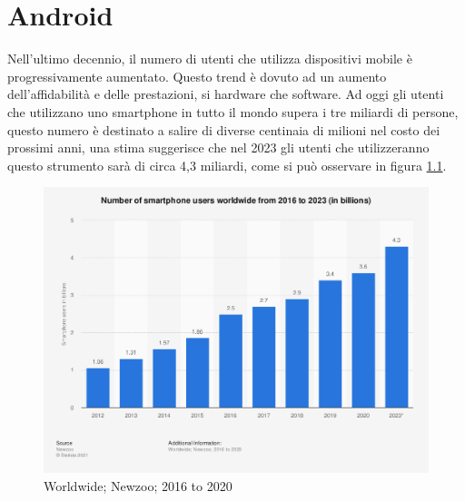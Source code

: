 
\chapter{Android}
\label{chap:cap2}

Nell'ultimo decennio, il numero di utenti che utilizza dispositivi mobile è progressivamente aumentato. Questo trend è dovuto ad un aumento dell'affidabilità e delle prestazioni, si hardware che software. Ad oggi gli utenti che utilizzano uno smartphone in tutto il mondo supera i tre miliardi di persone, questo numero è destinato a salire di diverse centinaia di milioni nel costo dei prossimi anni, una stima suggerisce che nel 2023 gli utenti che utilizzeranno questo strumento sarà di circa 4,3 miliardi\cite{numberofuser}, come si può osservare in figura \ref{fig:WordwideNewzoo}.
\begin{figure}[h]
\centering 
\includegraphics[width=0.7\linewidth]{imgs/capitolo2/intro/statistic_id330695_smartphone-users-worldwide-2016-2023.png} 
\caption{ Worldwide; Newzoo; 2016 to 2020} 
\label{fig:WordwideNewzoo} 
\end{figure}


